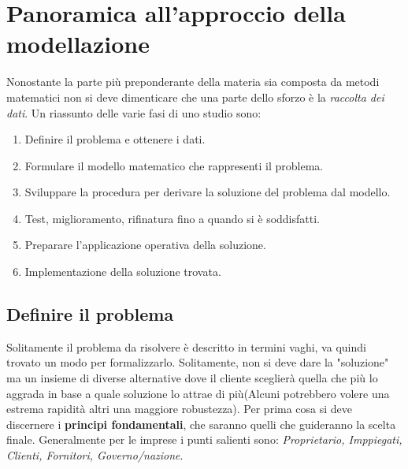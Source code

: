 \documentclass{article}
\begin{document}
  \section{Panoramica all'approccio della modellazione}
    Nonostante la parte più preponderante della materia sia composta da metodi matematici non si deve dimenticare che una parte dello sforzo è la \textit{raccolta dei dati}.
    Un riassunto delle varie fasi di uno studio sono:
    \begin{enumerate}
      \item Definire il problema e ottenere i dati.
      \item Formulare il modello matematico che rappresenti il problema.
      \item Sviluppare la procedura per derivare la soluzione del problema dal modello.
      \item Test, miglioramento, rifinatura fino a quando si è soddisfatti.
      \item Preparare l'applicazione operativa della soluzione.
      \item Implementazione della soluzione trovata.
    \end{enumerate}

    \subsection{Definire il problema}
      Solitamente il problema da risolvere è descritto in termini vaghi, va quindi trovato un modo per formalizzarlo. Solitamente, non si deve dare la "soluzione" ma un insieme di diverse alternative dove il cliente sceglierà quella che più lo aggrada in base a quale soluzione lo attrae di più(Alcuni potrebbero volere una estrema rapidità altri una maggiore robustezza). Per prima cosa si deve discernere i \textbf{principi fondamentali}, che saranno quelli che guideranno la scelta finale. Generalmente per le imprese i punti salienti sono: \textit{Proprietario, Imppiegati, Clienti, Fornitori, Governo/nazione}. 
\end{document}
